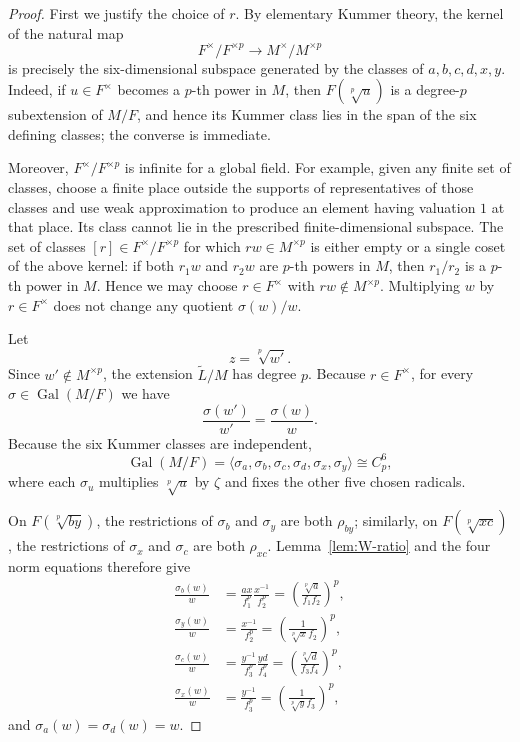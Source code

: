 \documentclass[10pt,a4paper]{amsart}
\DeclareMathOperator{\Gal}{Gal}
\begin{document}
\begin{proof}
First we justify the choice of $r$. By elementary Kummer theory, the kernel
of the natural map
\[
 F^\times/F^{\times p}\longrightarrow M^\times/M^{\times p}
\]
is precisely the six-dimensional subspace generated by the classes of
$a,b,c,d,x,y$. Indeed, if $u\in F^\times$ becomes a $p$-th power in $M$,
then $F(\sqrt[p]{u})$ is a degree-$p$ subextension of $M/F$, and hence its
Kummer class lies in the span of the six defining classes; the converse is
immediate.

Moreover, $F^\times/F^{\times p}$ is infinite for a global field. For
example, given any finite set of classes, choose a finite place outside the
supports of representatives of those classes and use weak approximation to
produce an element having valuation $1$ at that place. Its class cannot lie
in the prescribed finite-dimensional subspace. The set of classes
$[r]\in F^\times/F^{\times p}$ for which $rw\in M^{\times p}$ is either
empty or a single coset of the above kernel: if both $r_1w$ and $r_2w$ are
$p$-th powers in $M$, then $r_1/r_2$ is a $p$-th power in $M$. Hence we may
choose $r\in F^\times$ with $rw\notin M^{\times p}$. Multiplying $w$ by
$r\in F^\times$ does not change any quotient $\sigma(w)/w$.

Let
\[
 z=\sqrt[p]{w'}.
\]
Since $w'\notin M^{\times p}$, the extension $\widetilde L/M$ has degree
$p$. Because $r\in F^\times$, for every $\sigma\in\Gal(M/F)$ we have
\[
 \frac{\sigma(w')}{w'}=\frac{\sigma(w)}{w}.
\]
Because the six Kummer classes are independent,
\[
 \Gal(M/F)=
 \langle\sigma_a,\sigma_b,\sigma_c,\sigma_d,\sigma_x,\sigma_y\rangle
 \cong C_p^6,
\]
where each $\sigma_u$ multiplies $\sqrt[p]{u}$ by $\zeta$ and fixes the
other five chosen radicals.

On $F(\sqrt[p]{by})$, the restrictions of $\sigma_b$ and $\sigma_y$ are both
$\rho_{by}$; similarly, on $F(\sqrt[p]{xc})$, the restrictions of
$\sigma_x$ and $\sigma_c$ are both $\rho_{xc}$. Lemma~\ref{lem:W-ratio}
and the four norm equations therefore give
\begin{align*}
 \frac{\sigma_b(w)}{w}
 &=\frac{ax}{f_1^p}\frac{x^{-1}}{f_2^p}
 =\left(\frac{\sqrt[p]{a}}{f_1f_2}\right)^p,\\
 \frac{\sigma_y(w)}{w}
 &=\frac{x^{-1}}{f_2^p}
 =\left(\frac{1}{\sqrt[p]{x}f_2}\right)^p,\\
 \frac{\sigma_c(w)}{w}
 &=\frac{y^{-1}}{f_3^p}\frac{yd}{f_4^p}
 =\left(\frac{\sqrt[p]{d}}{f_3f_4}\right)^p,\\
 \frac{\sigma_x(w)}{w}
 &=\frac{y^{-1}}{f_3^p}
 =\left(\frac{1}{\sqrt[p]{y}f_3}\right)^p,
\end{align*}
and $\sigma_a(w)=\sigma_d(w)=w$.


\end{proof}
\end{document}
